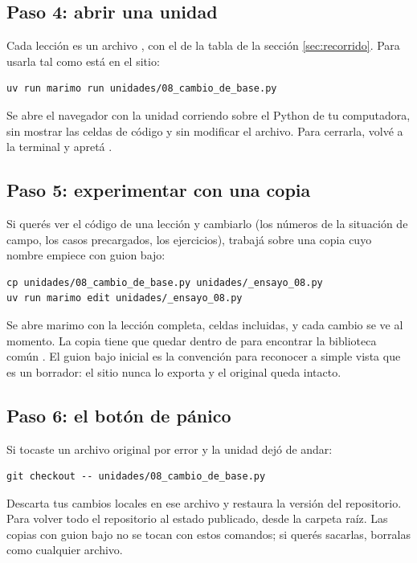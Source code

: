 \documentclass[11pt,a4paper]{report}
\newcommand{\clave}[1]{\texttt{\detokenize{#1}}}
\begin{document}
\subsection{Paso 4: abrir una unidad}

Cada lección es un archivo , con el \clave{<id>} de la tabla de la sección \ref{sec:recorrido}. Para usarla tal como está en el sitio:
\begin{lstlisting}[style=terminal]
uv run marimo run unidades/08_cambio_de_base.py
\end{lstlisting}
Se abre el navegador con la unidad corriendo sobre el Python de tu computadora, sin mostrar las celdas de código y sin modificar el archivo. Para cerrarla, volvé a la terminal y apretá \clave{Ctrl+C}.

\subsection{Paso 5: experimentar con una copia}

Si querés ver el código de una lección y cambiarlo (los números de la situación de campo, los casos precargados, los ejercicios), trabajá sobre una copia cuyo nombre empiece con guion bajo:
\begin{lstlisting}[style=terminal]
cp unidades/08_cambio_de_base.py unidades/_ensayo_08.py
uv run marimo edit unidades/_ensayo_08.py
\end{lstlisting}
Se abre marimo con la lección completa, celdas incluidas, y cada cambio se ve al momento. La copia tiene que quedar dentro de  para encontrar la biblioteca común . El guion bajo inicial es la convención para reconocer a simple vista que es un borrador: el sitio nunca lo exporta y el original queda intacto.

\subsection{Paso 6: el botón de pánico}

Si tocaste un archivo original por error y la unidad dejó de andar:
\begin{lstlisting}[style=terminal]
git checkout -- unidades/08_cambio_de_base.py
\end{lstlisting}
Descarta tus cambios locales en ese archivo y restaura la versión del repositorio. Para volver todo el repositorio al estado publicado, \clave{git checkout -- .} desde la carpeta raíz. Las copias con guion bajo no se tocan con estos comandos; si querés sacarlas, borralas como cualquier archivo.
\end{document}

